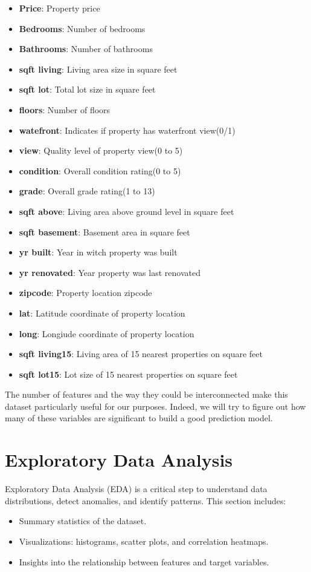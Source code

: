 \documentclass[a4paper, 12pt]{article}
\begin{document}
\begin{itemize}
\item \textbf{Price}: Property price
\item \textbf{Bedrooms}: Number of bedrooms
\item \textbf{Bathrooms}: Number of bathrooms
\item \textbf{sqft living}: Living area size in square feet
\item \textbf{sqft lot}: Total lot size in square feet
\item \textbf{floors}: Number of floors
\item \textbf{watefront}: Indicates if property has waterfront view(0/1)
\item \textbf{view}: Quality level of property view(0 to 5)
\item \textbf{condition}: Overall condition rating(0 to 5)
\item \textbf{grade}: Overall grade rating(1 to 13)
\item \textbf{sqft above}: Living area above ground level in square feet
\item \textbf{sqft basement}: Basement area in square feet
\item \textbf{yr built}: Year in witch property was built 
\item \textbf{yr renovated}: Year property was last renovated
\item \textbf{zipcode}: Property location zipcode
\item \textbf{lat}: Latitude coordinate of property location
\item \textbf{long}: Longiude coordinate of property location
\item \textbf{sqft living15}: Living area of 15 nearest properties on square feet
\item \textbf{sqft lot15}: Lot size of 15 nearest properties on square feet
\end{itemize}
The number of features and the way they could be interconnected make this dataset particularly useful for our purposes. Indeed, we will try to figure out how many of these variables are significant to build a good prediction model. 
\section{Exploratory Data Analysis}
\noindent
Exploratory Data Analysis (EDA) is a critical step to understand data distributions, detect anomalies, and identify patterns. This section includes:
\begin{itemize}
    \item Summary statistics of the dataset.
    \item Visualizations: histograms, scatter plots, and correlation heatmaps.
    \item Insights into the relationship between features and target variables.
\end{itemize}
\end{document}

